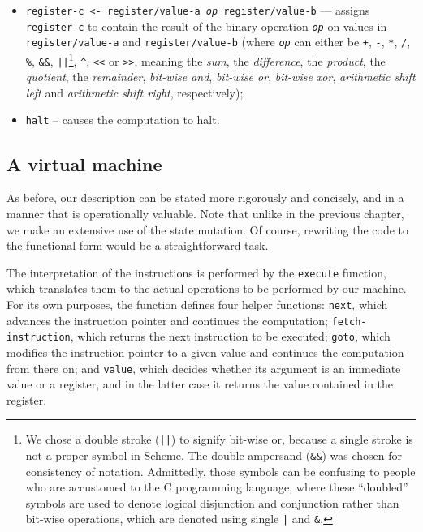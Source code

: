 \begin{itemize}
\item \texttt{register-c <- register/value-a \textit{op} register/value-b}
  --- assigns \texttt{register-c} to contain the result of the binary operation
  \texttt{\textit{op}} on values in \texttt{register/value-a}
  and \texttt{register/value-b} (where \texttt{\textit{op}} can either
  be \texttt{+}, \texttt{-}, \texttt{*}, \texttt{/}, \texttt{\%}, \texttt{\&\&},
  \texttt{||}\footnote{We chose a double stroke (\texttt{||}) to signify
    bit-wise or, because a single stroke is not a proper symbol in Scheme.
    The double ampersand (\texttt{\&\&}) was chosen for consistency
    of notation. Admittedly, those symbols can be confusing to people
    who are accustomed to the C programming language, where these ``doubled''
    symbols are used to denote logical disjunction and conjunction
    rather than bit-wise operations, which are denoted using single
    \texttt{|} and \texttt{\&}.}, \texttt{\^{}}, \texttt{<}\texttt{<}
  or \texttt{>}\texttt{>}, meaning the \textit{sum}, the \textit{difference},
  the \textit{product}, the \textit{quotient}, the \textit{remainder},
  \textit{bit-wise and}, \textit{bit-wise or}, \textit{bit-wise xor},
  \textit{arithmetic shift left} and \textit{arithmetic shift right},
  respectively);

\item \texttt{halt} -- causes the computation to halt.
  
\end{itemize}

\subsection{A virtual machine}

As before, our description can be stated more rigorously and concisely,
and in a manner that is operationally valuable. Note that unlike in
the previous chapter, we make an extensive use of the state mutation.
Of course, rewriting the code to the functional form would be
a straightforward task.

The interpretation of the instructions is performed by the \texttt{execute}
function, which translates them to the actual operations to be performed
by our machine. For its own purposes, the function defines four helper
functions: \texttt{next}, which advances the instruction pointer and
continues the computation; \texttt{fetch-instruction}, which returns
the next instruction to be executed; \texttt{goto}, which modifies
the instruction pointer to a given value and continues the computation
from there on; and \texttt{value}, which decides whether its argument
is an immediate value or a register, and in the latter case it returns
the value contained in the register.

